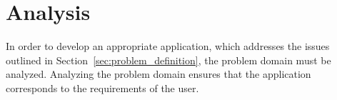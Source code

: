 \chapter{Analysis}
In order to develop an appropriate application, which addresses the issues outlined in Section~\ref{sec:problem_definition}, the problem domain must be analyzed.
Analyzing the problem domain ensures that the application corresponds to the requirements of the user.





